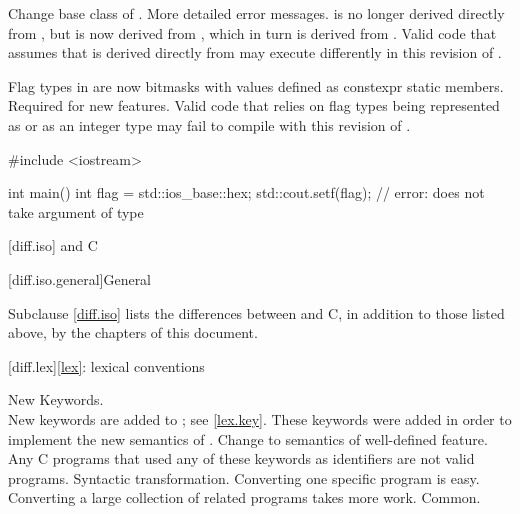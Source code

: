 \change
Change base class of .
\rationale
More detailed error messages.
\effect
{} is no longer derived directly from
, but is now derived from ,
which in turn is derived from . Valid \CppIII{} code
that assumes that  is derived directly from
 may execute differently in this revision of \Cpp{}.

\change
Flag types in  are now bitmasks with values
defined as constexpr static members.
\rationale
Required for new features.
\effect
Valid \CppIII{} code that relies on  flag types being
represented as  or as an integer type may fail to compile
with this revision of \Cpp{}.
\begin{example}
\begin{codeblock}
#include <iostream>

int main() {
  int flag = std::ios_base::hex;
  std::cout.setf(flag);         // error:  does not take argument of type 
}
\end{codeblock}
\end{example}

[diff.iso]{\Cpp{} and C}

[diff.iso.general]{General}

\pnum
{}%
Subclause \ref{diff.iso} lists the differences between \Cpp{} and C,
in addition to those listed above,
by the chapters of this document.

[diff.lex]{\ref{lex}: lexical conventions}

\change
New Keywords.\\
New keywords are added to \Cpp{};
see \ref{lex.key}.
\rationale
These keywords were added in order to implement the new
semantics of \Cpp{}.
\effect
Change to semantics of well-defined feature.
Any C programs that used any of these keywords as identifiers
are not valid \Cpp{} programs.
\difficulty
Syntactic transformation.
Converting one specific program is easy.
Converting a large collection
of related programs takes more work.
\howwide
Common.


